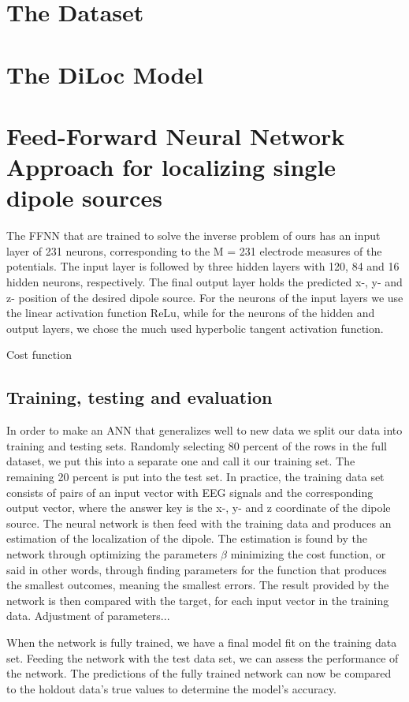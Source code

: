 \documentclass[a4paper, UKenglish, 11pt]{uiomaster}
\begin{document}
\section{The Dataset}

\section{The DiLoc Model}

\section{Feed-Forward Neural Network Approach for localizing single dipole sources}
The FFNN that are trained to solve the inverse problem of ours has an input layer of 231 neurons, corresponding to the M = 231 electrode measures of the potentials. The input layer is followed by three hidden layers with 120, 84 and 16 hidden neurons, respectively. The final output layer holds the predicted x-, y- and z- position of the desired dipole source. For the neurons of the input layers we use the linear activation function ReLu, while for the neurons of the hidden and output layers, we chose the much used hyperbolic tangent activation function.

Cost function

\subsection{Training, testing and evaluation}
In order to make an ANN that generalizes well to new data we split our data into training and testing sets. Randomly selecting 80 percent of the rows in the full dataset, we put this into a separate one and call it our training set. The remaining 20 percent is put into the test set. In practice, the training data set consists of pairs of an input vector with EEG signals and the corresponding output vector, where the answer key is the x-, y- and z coordinate of the dipole source. The neural network is then feed with the training data and produces an estimation of the localization of the dipole. The estimation is found by the network through optimizing the parameters $\beta$ minimizing the cost function, or said in other words, through finding parameters for the function that produces the smallest outcomes, meaning the smallest errors. The result provided by the network is then compared with the target, for each input vector in the training data. Adjustment of parameters...

When the network is fully trained, we have a final model fit on the training data set. Feeding the network with the test data set, we can assess the performance of the network. The predictions of the fully trained network can now be compared to the holdout data's true values to determine the model's accuracy.
\end{document}

